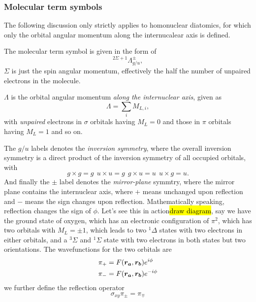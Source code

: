 \subsubsection{Molecular term symbols}
The following discussion only strictly applies to homonuclear diatomics, for which only the orbital angular momentum along the internucalear axis is defined.\par
The molecular term symbol is given in the form of 
\begin{equation}
	^{2\Sigma+1}\Lambda^{\pm}_{g/u},
\end{equation}
$\Sigma$ is just the spin angular momentum, effectively the half the number of unpaired electrons in the molecule.\par
$\Lambda$ is the orbital angular momentum \emph{along the internuclear axis}, given as
\begin{equation}
	\Lambda=\sum_i M_{L,i},
\end{equation}
with \emph{unpaired} electrons in $\sigma$ orbitals having $M_L=0$ and those in $\pi$ orbitals having $M_L=1$ and so on.\par
The $g/u$ labels denotes the \emph{inversion symmetry}, where the overall inversion symmetry is a direct product of the inversion symmetry of all occupied orbitals, with 
\begin{equation}
	g\times g=g\ \ u\times u=g\ \ g\times u=u\ \ u\times g=u.
\end{equation}
And finally the $\pm$ label denotes the \emph{mirror-plane} symmtry, where the mirror plane contains the internuclear axis, where $+$ means unchanged upon reflection and $-$ means the sign changes upon reflection. 
Mathematically speaking, reflection changes the sign of $\phi$. Let's see this in action\hl{draw diagram}, say we have the ground state of oxygen, which has an electronic configuration of $\pi^2$, which has two orbitals with $M_L=\pm 1$, which leads to two $^1\Delta$ states with two electrons in either orbitals, and a $^3\Sigma$ and $^1\Sigma$ state with two electrons in both states but two orientations. The wavefunctions for the two orbitals are
\begin{equation}
\begin{aligned}
	\pi_+&=F(\boldsymbol{r_a},\boldsymbol{r_b})e^{i\phi}\\
	\pi_-&=F(\boldsymbol{r_a},\boldsymbol{r_b})e^{-i\phi}
\end{aligned}
\end{equation}
we further define the reflection operator
\begin{equation}
	\sigma_{xy}\pi_{\pm}=\pi_{\mp}
\end{equation}
